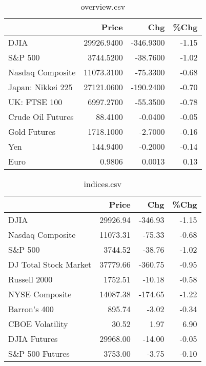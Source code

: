 \documentclass{article}%
\begin{document}
\begin{table}[htbp]%
\caption{overview.csv}%
\centering%
\begin{adjustbox}{width=1\textwidth}%
\begin{tabular}{lrrr}
\toprule
                  &      Price &       Chg &  \%Chg \\
\midrule
             DJIA & 29926.9400 & -346.9300 & -1.15 \\
          S\&P 500 &  3744.5200 &  -38.7600 & -1.02 \\
 Nasdaq Composite & 11073.3100 &  -75.3300 & -0.68 \\
Japan: Nikkei 225 & 27121.0600 & -190.2400 & -0.70 \\
     UK: FTSE 100 &  6997.2700 &  -55.3500 & -0.78 \\
Crude Oil Futures &    88.4100 &   -0.0400 & -0.05 \\
     Gold Futures &  1718.1000 &   -2.7000 & -0.16 \\
              Yen &   144.9400 &   -0.2000 & -0.14 \\
             Euro &     0.9806 &    0.0013 &  0.13 \\
\bottomrule
\end{tabular}
%
\end{adjustbox}%
\end{table}

%


\begin{table}[htbp]%
\caption{indices.csv}%
\centering%
\begin{adjustbox}{width=1\textwidth}%
\begin{tabular}{lrrr}
\toprule
                      &    Price &     Chg &  \%Chg \\
\midrule
                 DJIA & 29926.94 & -346.93 & -1.15 \\
     Nasdaq Composite & 11073.31 &  -75.33 & -0.68 \\
              S\&P 500 &  3744.52 &  -38.76 & -1.02 \\
DJ Total Stock Market & 37779.66 & -360.75 & -0.95 \\
         Russell 2000 &  1752.51 &  -10.18 & -0.58 \\
       NYSE Composite & 14087.38 & -174.65 & -1.22 \\
         Barron's 400 &   895.74 &   -3.02 & -0.34 \\
      CBOE Volatility &    30.52 &    1.97 &  6.90 \\
         DJIA Futures & 29968.00 &  -14.00 & -0.05 \\
      S\&P 500 Futures &  3753.00 &   -3.75 & -0.10 \\
\bottomrule
\end{tabular}
%
\end{adjustbox}%
\end{table}
\end{document}
